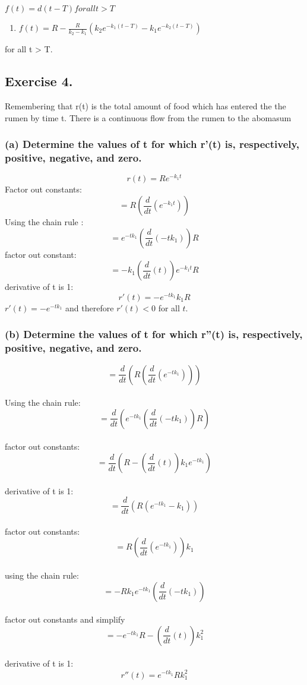 \documentclass[]{article}
\providecommand{\tightlist}{%
  \setlength{\itemsep}{0pt}\setlength{\parskip}{0pt}}
\begin{document}
\(f(t) = d(t-T) for all t > T\)

\begin{enumerate}
\def\labelenumi{(\arabic{enumi})}
\setcounter{enumi}{9}
\tightlist
\item
  \(f(t) = R - \frac{R}{k_2-k_1}(k_2e^{-k_1(t-T)}-k_1e^{-k_2(t-T)})\)
\end{enumerate}

for all t \textgreater{} T.

\subsection{Exercise 4.}\label{exercise-4.}

Remembering that r(t) is the total amount of food which has entered the
the rumen by time t. There is a continuous flow from the rumen to the
abomasum

\subsubsection{(a) Determine the values of t for which r'(t) is,
respectively, positive, negative, and
zero.}\label{a-determine-the-values-of-t-for-which-rt-is-respectively-positive-negative-and-zero.}

\[r(t) = Re^{-k_1t}\] Factor out constants:
\[=R(\frac{d}{dt}(e^{-k_1 t}))\] Using the chain rule :
\[= e^{-tk_1}(\frac{d}{dt}(-tk_1))R\] factor out constant:
\[=-k_1 (\frac{d}{dt}(t))e^{-k_1 t}R\] derivative of t is 1:
\[r'(t)= -e^{-tk_1}k_1R\] \(r'(t) = -e^{-t k_1}\) and therefore
\(r'(t) < 0\) for all \(t\).

\subsubsection{(b) Determine the values of t for which r''(t) is,
respectively, positive, negative, and
zero.}\label{b-determine-the-values-of-t-for-which-rt-is-respectively-positive-negative-and-zero.}

\[= \frac{d}{dt}(R(\frac{d}{dt}(e^{-tk_1})))\]\\
Using the chain rule:
\[= \frac{d}{dt}(e^{-tk_1}(\frac{d}{dt}(-tk_1))R)\]\\
factor out constants:
\[= \frac{d}{dt}(R -(\frac{d}{dt}(t))k_1 e^{-tk_1})\]\\
derivative of t is 1: \[= \frac{d}{dt}(R(e^{-tk_1}-k_1))\]\\
factor out constants: \[= R(\frac{d}{dt}(e^{-tk_1}))k_1\]\\
using the chain rule: \[= -Rk_1e^{-tk_1}(\frac{d}{dt}(-tk_1))\]\\
factor out constants and simplify
\[= -e^{-tk_1}R-(\frac{d}{dt}(t))k_1^2\]\\
derivative of t is 1: \[r''(t)= e^{-tk_1}Rk_1^2\]
\end{document}
